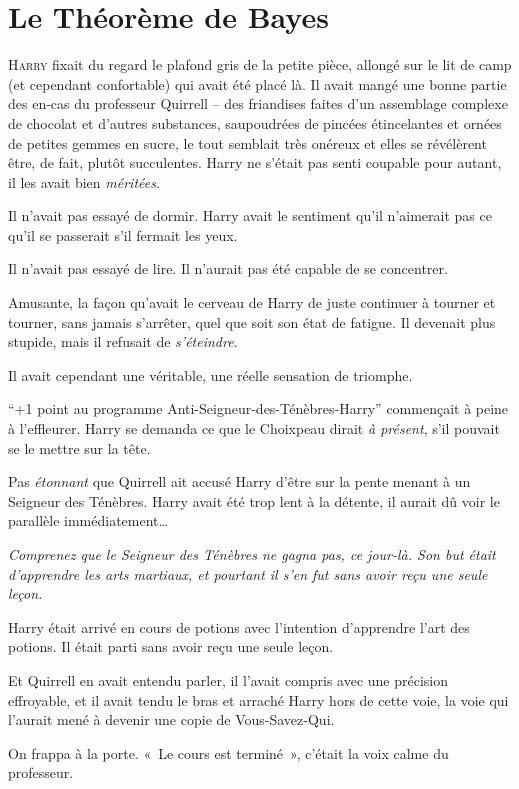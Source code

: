 \chapter{Le Théorème de Bayes}

\lettrine{H}{arry} fixait du regard le plafond gris de la petite pièce, allongé sur le lit de camp (et cependant confortable) qui avait été placé là.
Il avait mangé une bonne partie des en-cas du professeur Quirrell -- des friandises faites d'un assemblage complexe de chocolat et d'autres substances, saupoudrées de pincées étincelantes et ornées de petites gemmes en sucre, le tout semblait très onéreux et elles se révélèrent être, de fait, plutôt succulentes.
Harry ne s'était pas senti coupable pour autant, il les avait bien \emph{méritées}.

Il n'avait pas essayé de dormir.
Harry avait le sentiment qu'il n'aimerait pas ce qu'il se passerait s'il fermait les yeux.

Il n'avait pas essayé de lire.
Il n'aurait pas été capable de se concentrer.

Amusante, la façon qu'avait le cerveau de Harry de juste continuer à tourner et tourner, sans jamais s'arrêter, quel que soit son état de fatigue.
Il devenait plus stupide, mais il refusait de \emph{s'éteindre}.

Il avait cependant une véritable, une réelle sensation de triomphe.

“+1 point au programme Anti-Seigneur-des-Ténèbres-Harry” commençait à peine à l'effleurer.
Harry se demanda ce que le Choixpeau dirait \emph{à présent}, s'il pouvait se le mettre sur la tête.

Pas \emph{étonnant} que Quirrell ait accusé Harry d'être sur la pente menant à un Seigneur des Ténèbres.
Harry avait été trop lent à la détente, il aurait dû voir le parallèle immédiatement…

\emph{Comprenez que le Seigneur des Ténèbres ne gagna pas, ce jour-là.
Son but était d'apprendre les arts martiaux, et pourtant il s'en fut sans avoir reçu une seule leçon.}

Harry était arrivé en cours de potions avec l'intention d'apprendre l'art des potions.
Il était parti sans avoir reçu une seule leçon.

Et Quirrell en avait entendu parler, il l'avait compris avec une précision effroyable, et il avait tendu le bras et arraché Harry hors de cette voie, la voie qui l'aurait mené à devenir une copie de Vous-Savez-Qui.

On frappa à la porte.
«~Le cours est terminé~», c'était la voix calme du professeur.

